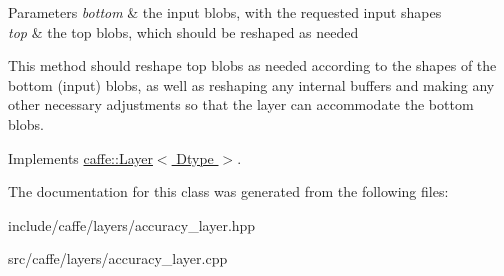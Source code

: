 \begin{DoxyParams}{Parameters}
{\em bottom} & the input blobs, with the requested input shapes \\
\hline
{\em top} & the top blobs, which should be reshaped as needed\\
\hline
\end{DoxyParams}
This method should reshape top blobs as needed according to the shapes of the bottom (input) blobs, as well as reshaping any internal buffers and making any other necessary adjustments so that the layer can accommodate the bottom blobs. 

Implements \hyperlink{classcaffe_1_1Layer_ad9d391b972c769c0ebee34ca6d1c973e}{caffe\+::\+Layer$<$ Dtype $>$}.



The documentation for this class was generated from the following files\+:\begin{DoxyCompactItemize}
\item 
include/caffe/layers/accuracy\+\_\+layer.\+hpp\item 
src/caffe/layers/accuracy\+\_\+layer.\+cpp\end{DoxyCompactItemize}
